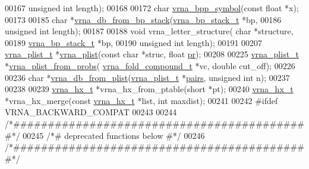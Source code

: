 \begin{DoxyCode}
00167                           \textcolor{keywordtype}{unsigned} \textcolor{keywordtype}{int} length);
00168 
00172 \textcolor{keywordtype}{char} \hyperlink{group__struct__utils_ga025bff1b27fa46534c8fae6980f64bb5}{vrna\_bpp\_symbol}(\textcolor{keyword}{const} \textcolor{keywordtype}{float} *x);
00173 
00185 \textcolor{keywordtype}{char} *\hyperlink{group__struct__utils_ga27bea2c241564af53a065982183389df}{vrna\_db\_from\_bp\_stack}(\hyperlink{group__data__structures_structvrna__bp__stack__s}{vrna\_bp\_stack\_t} *bp,
00186                             \textcolor{keywordtype}{unsigned} \textcolor{keywordtype}{int} length);
00187 
00188 \textcolor{keywordtype}{void} vrna\_letter\_structure( \textcolor{keywordtype}{char} *structure,
00189                             \hyperlink{group__data__structures_structvrna__bp__stack__s}{vrna\_bp\_stack\_t} *bp,
00190                             \textcolor{keywordtype}{unsigned} \textcolor{keywordtype}{int} length);
00191 
00207 \hyperlink{group__data__structures_structvrna__plist__s}{vrna\_plist\_t} *\hyperlink{group__struct__utils_gad4448f5d2c2da0e4ab1731a3586b2542}{vrna\_plist}(\textcolor{keyword}{const} \textcolor{keywordtype}{char} *struc, \textcolor{keywordtype}{float} \hyperlink{fold__vars_8h_ac98ec419070aee6831b44e5c700f090f}{pr});
00208 
00225 \hyperlink{group__data__structures_structvrna__plist__s}{vrna\_plist\_t} *\hyperlink{group__pf__fold_gaa3bf26a0ee2e9f2225afbaee44a37264}{vrna\_plist\_from\_probs}(
      \hyperlink{group__fold__compound_structvrna__fc__s}{vrna\_fold\_compound\_t} *vc, \textcolor{keywordtype}{double} cut\_off);
00226 
00236 \textcolor{keywordtype}{char} *\hyperlink{group__struct__utils_gab6a7a36c90836880f7ab09b9f6baf1af}{vrna\_db\_from\_plist}(\hyperlink{group__data__structures_structvrna__plist__s}{vrna\_plist\_t} *\hyperlink{group__struct__utils_ga6341cbb704924824e0236c1dce791032}{pairs}, \textcolor{keywordtype}{unsigned} \textcolor{keywordtype}{int} n);
00237 
00238 
00239 \hyperlink{group__struct__utils_structvrna__hx__s}{vrna\_hx\_t} *vrna\_hx\_from\_ptable(\textcolor{keywordtype}{short} *pt);
00240 \hyperlink{group__struct__utils_structvrna__hx__s}{vrna\_hx\_t} *vrna\_hx\_merge(\textcolor{keyword}{const} \hyperlink{group__struct__utils_structvrna__hx__s}{vrna\_hx\_t} *list, \textcolor{keywordtype}{int} maxdist);
00241 
00242 \textcolor{preprocessor}{#ifdef  VRNA\_BACKWARD\_COMPAT}
00243 
00244 \textcolor{comment}{/*###########################################*/}
00245 \textcolor{comment}{/*# deprecated functions below              #*/}
00246 \textcolor{comment}{/*###########################################*/}

\end{DoxyCode}
